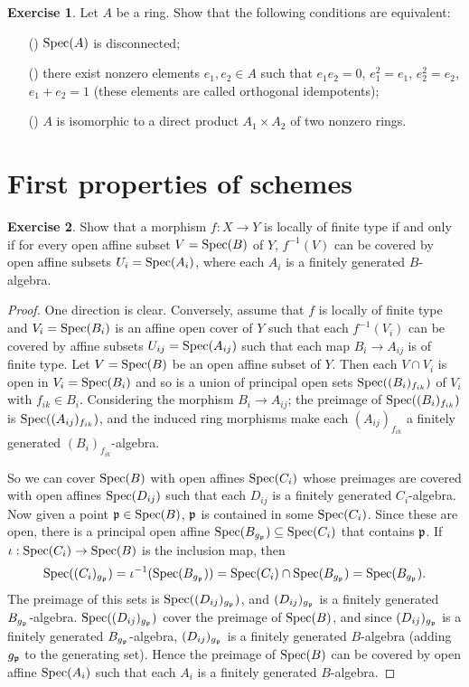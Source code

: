 \documentclass[11pt]{book}
\theoremstyle{definition}
\newtheorem{exercise}{Exercise}[section]
\begin{document}
\begin{exercise}
Let $A$ be a ring. Show that the following conditions are equivalent:
\begin{itemize}
\item[(\rmnum{1})] $\mathrm{Spec}(A)$ is disconnected;
\item[(\rmnum{2})] there exist nonzero elements $e_1,e_2\in A$ such that $e_1e_2=0$, $e_1^2=e_1$, $e_2^2=e_2$, $e_1+e_2=1$ (these elements are called orthogonal idempotents);
\item[(\rmnum{3})] $A$ is isomorphic to a direct product $A_1\times A_2$ of two nonzero rings.
\end{itemize}
\end{exercise}
\section{First properties of schemes}
\begin{exercise}
Show that a morphism $f:X\to Y$ is locally of finite type if and only if for every open affine subset $V=\mathrm{Spec}(B)$ of $Y$, $f^{-1}(V)$ can be covered by open affine subsets $U_i=\mathrm{Spec}(A_i)$, where each $A_i$ is a finitely generated $B$-algebra.
\end{exercise}
\begin{proof}
One direction is clear. Conversely, assume that $f$ is locally of finite type and $V_i=\mathrm{Spec}(B_i)$ is an affine open cover of $Y$ such that each $f^{-1}(V_i)$ can be covered by affine subsets $U_{ij}=\mathrm{Spec}(A_{ij})$ such that each map $B_i\to A_{ij}$ is of finite type. Let $V=\mathrm{Spec}(B)$ be an open affine subset of $Y$. Then each $V\cap V_i$ is open in $V_i=\mathrm{Spec}(B_i)$ and so is a union of principal open sets $\mathrm{Spec}((B_i)_{f_{ik}})$ of $V_i$ with $f_{ik}\in B_i$. Considering the morphism $B_i\to A_{ij}$; the preimage of $\mathrm{Spec}((B_i)_{f_{ik}})$ is $\mathrm{Spec}((A_{ij})_{f_{ik}})$, and the induced ring morphisms make each $(A_{ij})_{f_{ik}}$ a finitely generated $(B_i)_{f_{ik}}$-algebra.\par
So we can cover $\mathrm{Spec}(B)$ with open affines $\mathrm{Spec}(C_i)$ whose preimages are covered with open affines $\mathrm{Spec}(D_{ij})$ such that each $D_{ij}$ is a finitely generated $C_i$-algebra. Now given a point $\mathfrak{p}\in\mathrm{Spec}(B)$, $\mathfrak{p}$ is contained in some $\mathrm{Spec}(C_i)$. Since these are open, there is a principal open affine $\mathrm{Spec}(B_{g_{\mathfrak{p}}})\subseteq\mathrm{Spec}(C_i)$ that contains $\mathfrak{p}$. If $\iota:\mathrm{Spec}(C_i)\to\mathrm{Spec}(B)$ is the inclusion map, then
\[\mathrm{Spec}((C_i)_{g_{\mathfrak{p}}})=\iota^{-1}(\mathrm{Spec}(B_{g_{\mathfrak{p}}}))=\mathrm{Spec}(C_i)\cap\mathrm{Spec}(B_{g_{\mathfrak{p}}})=\mathrm{Spec}(B_{g_{\mathfrak{p}}}).\] 
The preimage of this sets is $\mathrm{Spec}((D_{ij})_{g_{\mathfrak{p}}})$, and $(D_{ij})_{g_{\mathfrak{p}}}$ is a finitely generated $B_{g_{\mathfrak{p}}}$-algebra. $\mathrm{Spec}((D_{ij})_{g_{\mathfrak{p}}})$ cover the preimage of $\mathrm{Spec}(B)$, and since $(D_{ij})_{g_{\mathfrak{p}}}$ is a finitely generated $B_{g_{\mathfrak{p}}}$-algebra, $(D_{ij})_{g_{\mathfrak{p}}}$ is a finitely generated $B$-algebra (adding $g_{\mathfrak{p}}$ to the generating set). Hence the preimage of $\mathrm{Spec}(B)$ can be covered by open affine $\mathrm{Spec}(A_i)$ such that each $A_i$ is a finitely generated $B$-algebra.
\end{proof}
\end{document}
